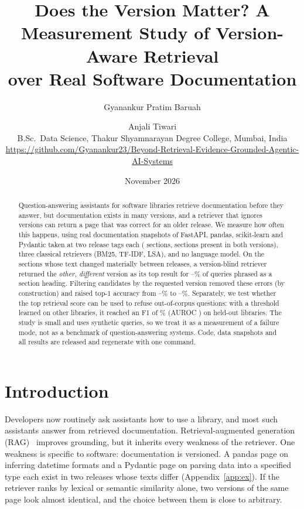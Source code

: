 \documentclass[11pt,a4paper]{article}
\title{Does the Version Matter? A Measurement Study of Version-Aware Retrieval\\ over Real Software Documentation}
\author{Gyanankur Pratim Baruah \and Anjali Tiwari\\[2pt]
\small B.Sc.\ Data Science, Thakur Shyamnarayan Degree College, Mumbai, India\\
\small \url{https://github.com/Gyanankur23/Beyond-Retrieval-Evidence-Grounded-Agentic-AI-Systems}}
\date{November 2026}
\begin{document}
\maketitle

\begin{abstract}
Question-answering assistants for software libraries retrieve documentation before they answer, but
documentation exists in many versions, and a retriever that ignores versions can return a page that was
correct for an older release. We measure how often this happens, using real documentation snapshots of
FastAPI, pandas, scikit-learn and Pydantic taken at two release tags each (\NSections{} sections, \NPairs{}
sections present in both versions), three classical retrievers (BM25, TF-IDF, LSA), and no language model.
On the \NChanged{} sections whose text changed materially between releases, a version-blind retriever returned the
\emph{other, different} version as its top result for \StaleHMin--\StaleHMax\% of queries phrased as a section
heading. Filtering candidates by the requested version removed these errors (by construction) and raised top-1
accuracy from \HitBlindHMin--\HitBlindHMax\% to \HitAwareHMin--\HitAwareHMax\%. Separately, we test whether the
top retrieval score can be used to refuse out-of-corpus questions: with a threshold learned on other libraries, it
reached an F1 of \CFscore\% (AUROC \CauROC) on held-out libraries. The study is small and uses synthetic queries, so we
treat it as a measurement of a failure mode, not as a benchmark of question-answering systems. Code, data
snapshots and all results are released and regenerate with one command.
\end{abstract}

\section{Introduction}
Developers now routinely ask assistants how to use a library, and most such assistants answer from retrieved
documentation. Retrieval-augmented generation (RAG)~\cite{lewis2020rag} improves grounding, but it inherits every
weakness of the retriever. One weakness is specific to software: documentation is versioned. A pandas page on inferring datetime formats and a Pydantic page on parsing data into a specified type
each exist in two releases whose texts differ (Appendix~\ref{app:ex}). If the retriever ranks by lexical or semantic similarity alone, two
versions of the same page look almost identical, and the choice between them is close to arbitrary.
\end{document}
